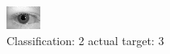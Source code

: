 \begin{figure}[h!]
\begin{center}
\includegraphics[width=0.60\columnwidth]{figures/ID635_class_2_target_3.png}
\end{center}
\caption{ Classification: 2 actual target: 3}
\label{fig:ID635_class_2_target_3}
\end{figure}
